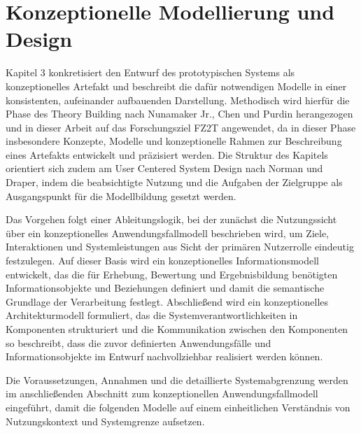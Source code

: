 
\chapter{Konzeptionelle Modellierung und Design}\label{cap:KonzepModelDesign}

Kapitel 3 konkretisiert den Entwurf des prototypischen Systems als konzeptionelles Artefakt und beschreibt die dafür notwendigen Modelle in einer konsistenten, aufeinander aufbauenden Darstellung. \cite{nunamaker1990}
Methodisch wird hierfür die Phase des Theory Building nach Nunamaker Jr., Chen und Purdin herangezogen und in dieser Arbeit auf das Forschungsziel FZ2T angewendet, da in dieser Phase insbesondere Konzepte, Modelle und konzeptionelle Rahmen zur Beschreibung eines Artefakts entwickelt und präzisiert werden. \cite{nunamaker1990}
Die Struktur des Kapitels orientiert sich zudem am User Centered System Design nach Norman und Draper, indem die beabsichtigte Nutzung und die Aufgaben der Zielgruppe als Ausgangspunkt für die Modellbildung gesetzt werden. \cite{norman_draper1986}

Das Vorgehen folgt einer Ableitungslogik, bei der zunächst die Nutzungssicht über ein konzeptionelles Anwendungsfallmodell beschrieben wird, um Ziele, Interaktionen und Systemleistungen aus Sicht der primären Nutzerrolle eindeutig festzulegen. \cite{norman_draper1986}
Auf dieser Basis wird ein konzeptionelles Informationsmodell entwickelt, das die für Erhebung, Bewertung und Ergebnisbildung benötigten Informationsobjekte und Beziehungen definiert und damit die semantische Grundlage der Verarbeitung festlegt. \cite{nunamaker1990}
Abschließend wird ein konzeptionelles Architekturmodell formuliert, das die Systemverantwortlichkeiten in Komponenten strukturiert und die Kommunikation zwischen den Komponenten so beschreibt, dass die zuvor definierten Anwendungsfälle und Informationsobjekte im Entwurf nachvollziehbar realisiert werden können. \cite{nunamaker1990}

Die Voraussetzungen, Annahmen und die detaillierte Systemabgrenzung werden im anschließenden Abschnitt zum konzeptionellen Anwendungsfallmodell eingeführt, damit die folgenden Modelle auf einem einheitlichen Verständnis von Nutzungskontext und Systemgrenze aufsetzen. \cite{norman_draper1986}


